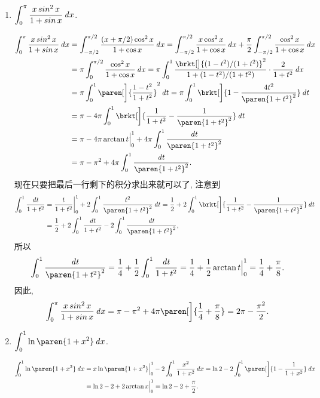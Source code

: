 \begin{enumerate}
\item \(\displaystyle \int_0^\pi \frac{x \operatorname{\smash{sin}}^2 x}{1 + \operatorname{\smash{sin}} x} \mathop{}\!\mathit{d} x\).

  \ifshowsol
    \[
      \begin{split}
        \int_0^\pi \frac{x \sin^2 x}{1 + \sin x} \dx
        &= \int_{-\pi/2}^{\pi/2} \frac{(x+\pi/2) \cos^2 x}{1 + \cos x} \dx
          = \int_{-\pi/2}^{\pi/2} \frac{x \cos^2 x}{1 + \cos x} \dx + \frac\pi2 \int_{-\pi/2}^{\pi/2} \frac{\cos^2 x}{1 + \cos x} \dx \\
        &= \pi \int_0^{\pi/2} \frac{\cos^2 x}{1 + \cos x} \dx
          = \pi \int_0^1 \frac{\brkt[\big]{(1-t^2)/(1+t^2)}^2}{1 + (1-t^2)/(1+t^2)} \cdot \frac2{1+t^2} \dx \\
        &= \pi \int_0^1 \paren[\bigg]{\frac{1-t^2}{1+t^2}}^2 \dt
          = \pi \int_0^1 \brkt[\bigg]{1 - \frac{4t^2}{\paren{1+t^2}^2}} \dt \\
        &= \pi - 4 \pi \int_0^1 \brkt[\bigg]{\frac{1}{1+t^2} - \frac{1}{\paren{1+t^2}^2}} \dt \\
        &= \pi - 4 \pi \arctan t \Big\vert_0^1 + 4 \pi \int_0^1 \frac{\dt}{\paren{1+t^2}^2} \\
        &= \pi - \pi^2 + 4 \pi \int_0^1 \frac{\dt}{\paren{1+t^2}^2}.
      \end{split}
    \]
    现在只要把最后一行剩下的积分求出来就可以了, 注意到
    \[
      \begin{split}
        \int_0^1 \frac{\dt}{1+t^2}
        &= \frac{t}{1+t^2} \bigg\vert_0^1 + 2 \int_0^1 \frac{t^2}{\paren{1+t^2}^2} \dt
          = \frac12 + 2 \int_0^1 \brkt[\bigg]{\frac{1}{1+t^2} - \frac{1}{\paren{1+t^2}^2}} \dt \\
        &= \frac12 + 2 \int_0^1 \frac{\dt}{1+t^2} - 2 \int_0^1 \frac{\dt}{\paren{1+t^2}^2},
      \end{split}
    \]
    所以
    \[
      \int_0^1 \frac{\dt}{\paren{1+t^2}^2}
      = \frac14 + \frac12 \int_0^1 \frac{\dt}{1+t^2}
      = \frac14 + \frac12 \arctan t \Big\vert_0^1
      = \frac14 + \frac\pi8.
    \]
    因此,
    \[
      \int_0^\pi \frac{x \sin^2 x}{1 + \sin x} \dx
      = \pi - \pi^2 + 4 \pi \paren[\bigg]{\frac14 + \frac\pi8}
      = 2 \pi - \frac{\pi^2}{2}.
    \]
  \fi

\item \(\displaystyle \int_0^1 \ln\paren{1+x^2} \dx\).

  \ifshowsol
    \[
      \begin{split}
        \int_0^1 \ln\paren{1+x^2} \dx
        &= x \ln\paren{1+x^2} \Big\vert_0^1 - 2 \int_0^1 \frac{x^2}{1+x^2} \dx
          = \ln2 - 2 \int_0^1 \paren[\bigg]{1 - \frac{1}{1+x^2}} \dx \\
        &= \ln 2 - 2 + 2 \arctan x \Big\vert_0^1
          = \ln 2 - 2 + \frac\pi2.
      \end{split}
    \]
  \fi


\end{enumerate}

